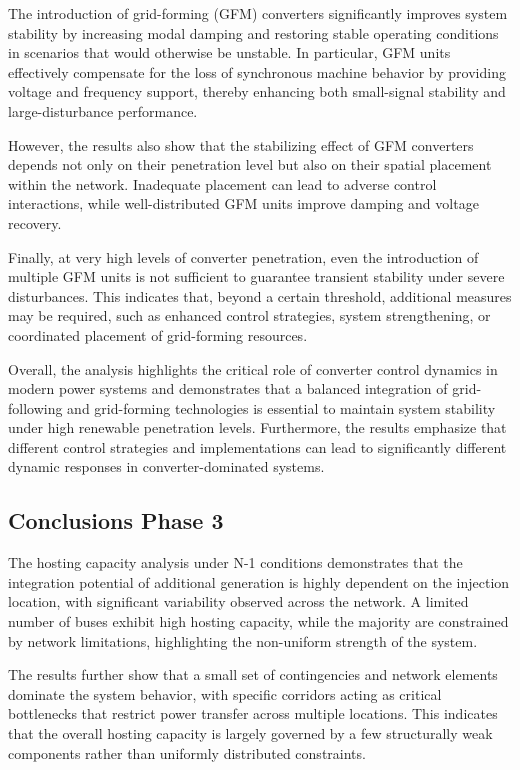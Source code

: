 The introduction of grid-forming (GFM) converters significantly improves system stability by increasing modal damping and restoring stable operating conditions in scenarios that would otherwise be unstable. In particular, GFM units effectively compensate for the loss of synchronous machine behavior by providing voltage and frequency support, thereby enhancing both small-signal stability and large-disturbance performance.

However, the results also show that the stabilizing effect of GFM converters depends not only on their penetration level but also on their spatial placement within the network. Inadequate placement can lead to adverse control interactions, while well-distributed GFM units improve damping and voltage recovery.

Finally, at very high levels of converter penetration, even the introduction of multiple GFM units is not sufficient to guarantee transient stability under severe disturbances. This indicates that, beyond a certain threshold, additional measures may be required, such as enhanced control strategies, system strengthening, or coordinated placement of grid-forming resources.

Overall, the analysis highlights the critical role of converter control dynamics in modern power systems and demonstrates that a balanced integration of grid-following and grid-forming technologies is essential to maintain system stability under high renewable penetration levels. Furthermore, the results emphasize that different control strategies and implementations can lead to significantly different dynamic responses in converter-dominated systems.

\subsection*{Conclusions Phase 3}

The hosting capacity analysis under N-1 conditions demonstrates that the integration potential of additional generation is highly dependent on the injection location, with significant variability observed across the network. A limited number of buses exhibit high hosting capacity, while the majority are constrained by network limitations, highlighting the non-uniform strength of the system.

The results further show that a small set of contingencies and network elements dominate the system behavior, with specific corridors acting as critical bottlenecks that restrict power transfer across multiple locations. This indicates that the overall hosting capacity is largely governed by a few structurally weak components rather than uniformly distributed constraints.

